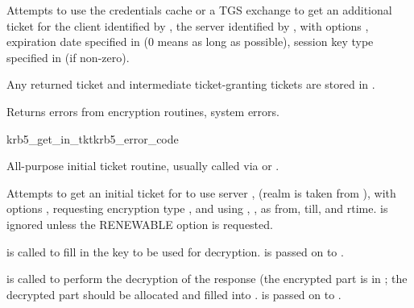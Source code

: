 Attempts to use the credentials cache  or a TGS
exchange to get an additional ticket for the client identified by
, the server identified by
, with options ,
expiration date specified in  (0
means as long as possible), session key type specified in
 (if non-zero).

Any returned ticket and intermediate ticket-granting tickets are
stored in .

Returns errors from encryption routines, system errors.

\begin{funcdecl}{krb5_get_in_tkt}{krb5_error_code}{\funcin}
\funcendfuncarg
{}
\funcendfuncarg
{}
\funcinout
{}
\end{funcdecl}

All-purpose initial ticket routine, usually called via
 or
.

Attempts to get an initial ticket for  to use server
, (realm is taken from
), with options 
, requesting encryption type , and using
,  ,
as from, till, and rtime.   is
ignored unless the RENEWABLE option is requested.

 is called to fill in the key to be used for decryption.
 is passed on to .

 is called to perform the decryption of the
response (the encrypted part is in ; the
decrypted part should be allocated and filled into
.
 is passed on to .

